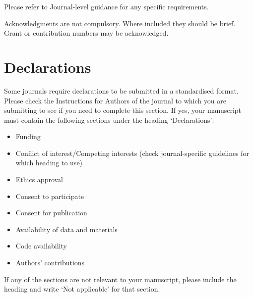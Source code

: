 \documentclass[default,pdflatex,iicol]{sn-jnl}%
\begin{document}
Please refer to Journal-level guidance for any specific requirements.


Acknowledgments are not compulsory. Where included they should be brief. Grant or contribution numbers may be acknowledged.

\section*{Declarations}

Some journals require declarations to be submitted in a standardised format. Please check the Instructions for Authors of the journal to which you are submitting to see if you need to complete this section. If yes, your manuscript must contain the following sections under the heading `Declarations':

\begin{itemize}
\item Funding
\item Conflict of interest/Competing interests (check journal-specific guidelines for which heading to use)
\item Ethics approval 
\item Consent to participate
\item Consent for publication
\item Availability of data and materials
\item Code availability 
\item Authors' contributions
\end{itemize}

\noindent
If any of the sections are not relevant to your manuscript, please include the heading and write `Not applicable' for that section. 



\end{document}
